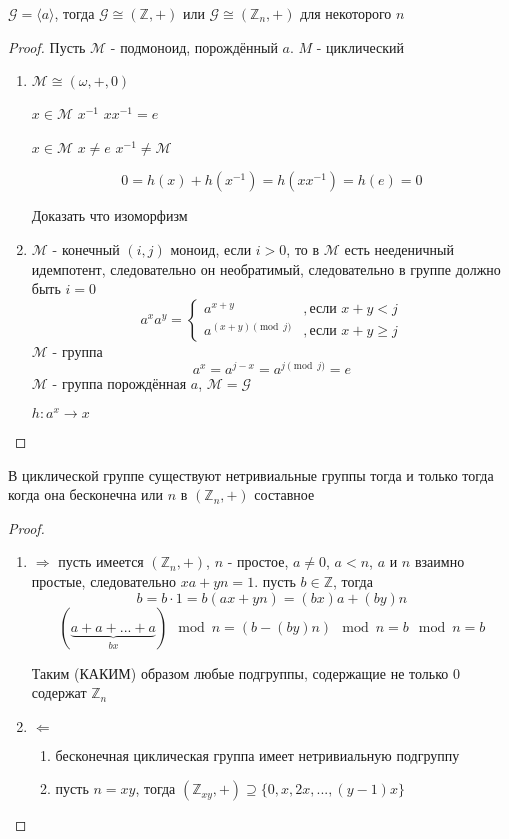 \documentclass[../main/document.tex]{subfiles}
\begin{document}
\begin{thm}
$\mathcal{G}=\langle a\rangle$, тогда $\mathcal{G}\cong (\mathbb{Z},+)$ или  $\mathcal{G}\cong (\mathbb{Z}_n,+)$ для некоторого $n$
\begin{proof}
Пусть $\mathcal{M}$ - подмоноид, порождённый $a$. $M$ - циклический
\begin{enumerate}
\item $\mathcal{M} \cong (\omega,+,0)$

$x\in \mathcal{M}$ $x^{-1}$ $xx^{-1}=e$

$x\in \mathcal{M}$ $x\neq e$ $x^{-1}\neq \mathcal{M}$

$$0=h(x)+h(x^{-1})=h(xx^{-1})=h(e)=0$$

Доказать что изоморфизм
\item $\mathcal{M}$ - конечный $(i,j)$ моноид, если $i>0$, то в $\mathcal{M}$ есть нееденичный идемпотент, следовательно он необратимый, следовательно в группе должно быть $i=0$
$$a^xa^y=\begin{cases} a^{x+y} &,\mbox{если } x+y<j\\
a^{(x+y)\pmod j}&,\mbox{если } x+y\geq j\end{cases}$$
$\mathcal{M}$ - группа
$$a^x=a^{j-x}=a^{j\pmod j}=e$$
$\mathcal{M}$ - группа порождённая $a$, $\mathcal{M}=\mathcal{G}$

$h:a^x\rightarrow x$
\end{enumerate}
\end{proof}
\end{thm}
\begin{thm}
В циклической группе существуют нетривиальные группы тогда и только тогда когда она бесконечна или $n$ в $(\mathbb{Z}_n,+)$ составное 
\begin{proof}
\begin{enumerate}
\item $\Rightarrow$ пусть имеется $(\mathbb{Z}_n,+)$, $n$ - простое, $a\neq 0$, $a<n$, $a$ и $n$ взаимно простые, следовательно $xa+yn=1$. пусть $b\in \mathbb{Z}$, тогда 
$$b=b\cdot 1=b(ax+yn)=(bx)a+(by)n$$
$$(\underbrace{a+a+...+a}_{bx})\mod n=(b-(by)n)\mod n=b\mod n=b$$

Таким (КАКИМ) образом любые подгруппы, содержащие не только $0$ содержат $\mathbb{Z}_n$
\item $\Leftarrow$ 
\begin{enumerate}
    \item бесконечная циклическая группа имеет нетривиальную подгруппу
    \item пусть $n=xy$, тогда $(\mathbb{Z}_{xy},+)\supseteq \{0,x,2x,...,(y-1)x\}$
  \end{enumerate}
\end{enumerate}
\end{proof}
\end{thm}
\end{document}
